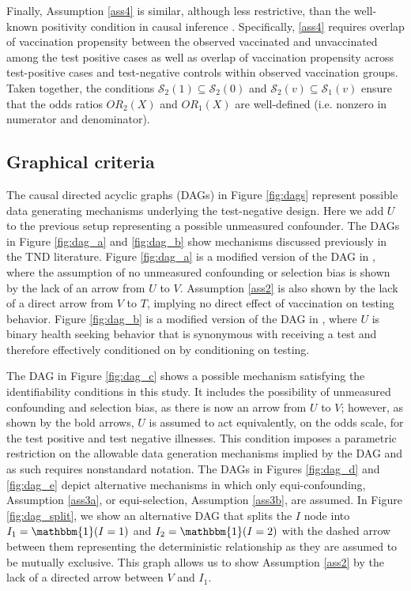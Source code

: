 \documentclass[11pt]{article}
\begin{document}
Finally, Assumption \ref{ass4} is similar, although less restrictive, than the well-known positivity condition in causal inference \cite{hernan_causal_2020}. Specifically, \ref{ass4} requires overlap of vaccination propensity between the observed vaccinated and unvaccinated among the test positive cases as well as overlap of vaccination propensity across test-positive cases and test-negative controls within observed vaccination groups. Taken together, the conditions $\mathcal{S}_2(1) \subseteq \mathcal{S}_2(0)$ and $\mathcal{S}_2(v) \subseteq \mathcal{S}_1(v)$ ensure that the odds ratios $OR_2(X)$ and $OR_1(X)$ are well-defined (i.e. nonzero in numerator and denominator).

\subsection{Graphical criteria} \label{sec:graphical}
The causal directed acyclic graphs (DAGs) in Figure \ref{fig:dags} represent possible data generating mechanisms underlying the test-negative design. Here we add $U$ to the previous setup representing a possible unmeasured confounder. The DAGs in Figure \ref{fig:dag_a} and \ref{fig:dag_b} show mechanisms discussed previously in the TND literature. Figure \ref{fig:dag_a} is a modified version of the DAG in \citeauthor{schnitzer_estimands_2022} \cite{schnitzer_estimands_2022}, where the assumption of no unmeasured confounding or selection bias is shown by the lack of an arrow from $U$ to $V$. Assumption \ref{ass2} is also shown by the lack of a direct arrow from $V$ to $T$, implying no direct effect of vaccination on testing behavior. Figure \ref{fig:dag_b} is a modified version of the DAG in \citeauthor{sullivan_theoretical_2016} \cite{sullivan_theoretical_2016}, where $U$ is binary health seeking behavior that is synonymous with receiving a test and therefore effectively conditioned on by conditioning on testing.  

The DAG in Figure \ref{fig:dag_c} shows a possible mechanism satisfying the identifiability conditions in this study. It includes the possibility of unmeasured confounding and selection bias, as there is now an arrow from $U$ to $V$; however, as shown by the bold arrows, $U$ is assumed to act equivalently, on the odds scale, for the test positive and test negative illnesses. This condition imposes a parametric restriction on the allowable data generation mechanisms implied by the DAG and as such requires nonstandard notation. The DAGs in Figures \ref{fig:dag_d} and \ref{fig:dag_e} depict alternative mechanisms in which only equi-confounding, Assumption \ref{ass3a}, or equi-selection, Assumption \ref{ass3b}, are assumed. In Figure \ref{fig:dag_split}, we show an alternative DAG that splits the $I$ node into $I_1 = \mathbbm{1}(I = 1)$ and $I_2 = \mathbbm{1}(I = 2)$ with the dashed arrow between them representing the deterministic relationship as they are assumed to be mutually exclusive. This graph allows us to show Assumption \ref{ass2} by the lack of a directed arrow between $V$ and $I_1$. 
\end{document}
